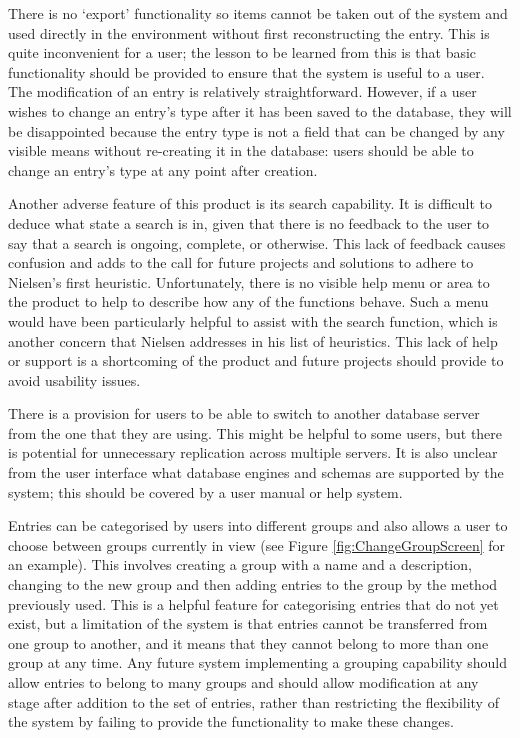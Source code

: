 There is no `export' functionality so items cannot be taken out of the system and used directly in the \bibtex{} environment without first reconstructing the entry.  This is quite inconvenient for a user; the lesson to be learned from this is that basic functionality should be provided to ensure that the system is useful to a user.
The modification of an entry is relatively straightforward.  However, if a user wishes to change an entry's type after it has been saved to the database, they will be disappointed because the entry type is not a field that can be changed by any visible means without re-creating it in the database: users should be able to change an entry's type at any point after creation.

Another adverse feature of this product is its search capability.  It is difficult to deduce what state a search is in, given that there is no feedback to the user to say that a search is ongoing, complete, or otherwise.  This lack of feedback causes confusion and adds to the call for future projects and solutions to adhere to Nielsen's first heuristic. Unfortunately, there is no visible help menu or area to the product to help to describe how any of the functions behave. Such a menu would have been particularly helpful to assist with the search function, which is another concern that Nielsen addresses in his list of heuristics.  This lack of help or support is a shortcoming of the product and future projects should provide to avoid usability issues.

There is a provision for users to be able to switch to another database server from the one that they are using.  This might be helpful to some users, but there is potential for unnecessary replication across multiple servers.  It is also unclear from the user interface what database engines and schemas are supported by the system; this should be covered by a user manual or help system.

Entries can be categorised by users into different groups and also allows a user to choose between groups currently in view (see Figure \ref{fig:ChangeGroupScreen} for an example).  This involves creating a group with a name and a description, changing to the new group and then adding entries to the group by the method previously used.  This is a helpful feature for categorising entries that do not yet exist, but a limitation of the system is that entries cannot be transferred from one group to another, and it means that they cannot belong to more than one group at any time.  Any future system implementing a grouping capability should allow entries to belong to many groups and should allow modification at any stage after addition to the set of entries, rather than restricting the flexibility of the system by failing to provide the functionality to make these changes.

